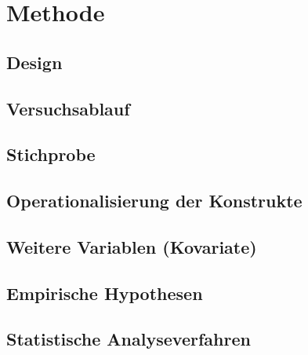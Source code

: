\section{Methode}
\subsection{Design}
\subsection{Versuchsablauf}
\subsection{Stichprobe}
\subsection{Operationalisierung der Konstrukte}
\subsection{Weitere Variablen (Kovariate)}
\subsection{Empirische Hypothesen}
\subsection{Statistische Analyseverfahren}